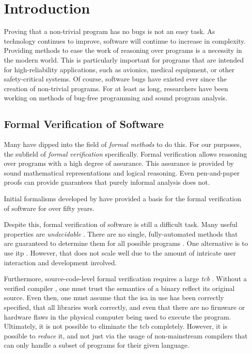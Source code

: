 \chapter{Introduction}
Proving that a non-trivial program has no bugs is not an easy task.
As technology continues to improve, software will continue to increase in complexity.
Providing methods to ease the work of reasoning over programs is a necessity in the modern world.
This is particularly important for programs that are intended for high-reliability applications,
such as avionics, medical equipment, or other safety-critical systems.
Of course, software bugs have existed ever since the creation of non-trivial programs.
For at least as long, researchers have been working on methods of bug-free programming and sound program analysis.

\section{Formal Verification of Software}
Many have dipped into the field of \emph{formal methods} \autocite{butler:fm} to do this.
For our purposes, the subfield of \emph{formal verification} specifically.
Formal verification allows reasoning over programs with a high degree of assurance.
This assurance is provided by sound mathematical representations and logical reasoning.
Even pen-and-paper proofs can provide guarantees that purely informal analysis does not.

Initial formalisms developed by \textcite{floyd1967assigning,hoare1969axiomatic} have provided a basis for the formal verification of software for over fifty years.

Despite this, formal verification of software is still a difficult task.
Many useful properties are \emph{undecidable} \autocite{rice1953classes,horspool1980approach,ouimet2008formal}.
There are no single, fully-automated methods that are guaranteed to determine them for all possible programs \autocite{bonacina2010theoremproving}.
One alternative is to use \ac{itp} \autocite{harrison2014itp,maric2015itp,schopf2018itp}.
However, that does not scale well due to the amount of intricate user interaction and development involved.

Furthermore, source-code-level formal verification requires a large \emph{\ac{tcb}}
\autocites[270]{lampson1992authentication}{orange-book}[13]{rushby1981dvss}.
Without a verified compiler \autocite{leroy:compcert}, one must trust the semantics of a binary reflect its original source.
Even then, one must assume that the \ac{isa} in use has been correctly specified, that all libraries work correctly, and even that there are no firmware or hardware flaws in the physical computer being used to execute the program.
Ultimately, it is not possible to eliminate the \ac{tcb} completely.
However, it is possible to \emph{reduce} it, and not just via the usage of non-mainstream compilers that can only handle a subset of programs for their given language.

